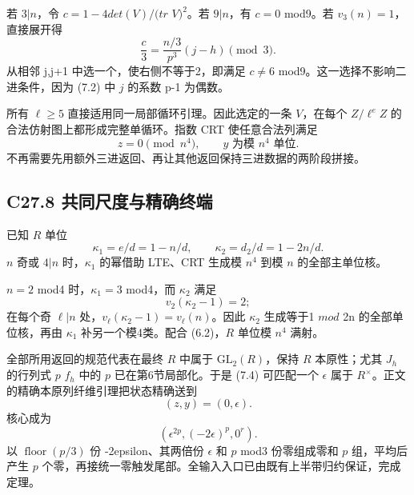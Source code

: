{若} {\ensuremath{3|n}，令} {\ensuremath{c=1-4det(V)/(tr}} {\ensuremath{V)^{2}}。若} {\ensuremath{9|n}，有} {\ensuremath{c=0}} {mod9。若} {\ensuremath{v_{3}(n)=1}，直接展开得} \[
\frac c3=\frac{n/3}{p^3}(j-h)\pmod3.
\tag{C27.7.3}
\] {从相邻} {j,j+1} {中选一个，使右侧不等于2，即满足} {\ensuremath{c\ne 6}} {mod9。这一选择不影响二进条件，因为} {(7.2)} {中} {\ensuremath{j}} {的系数} {p-1} {为偶数。}

{所有} {\ensuremath{\ell \ge 5}} {直接适用同一局部循环引理。因此选定的一条} {\ensuremath{V}，在每个} {\ensuremath{Z/\ell ^{e}Z}} {的合法仿射图上都形成完整单循环。指数} {CRT} {使任意合法列满足} \[
z=0\pmod{n^4},\qquad y\text{ 为模 }n^4\text{ 单位}.
\tag{C27.7.4}
\] {不再需要先用额外三进返回、再让其他返回保持三进数据的两阶段拼接。}

\subsection*{\texorpdfstring{{C27.8} {共同尺度与精确终端}}{C27.8 共同尺度与精确终端}}\label{C27-h175}

{已知} {\ensuremath{R}} {单位} \[
\kappa_1=e/d=1-n/d,\qquad
\kappa_2=d_2/d=1-2n/d.
\] {\ensuremath{n}} {奇或} {\ensuremath{4|n}} {时，\ensuremath{\kappa _{1}}} {的幂借助} {LTE、CRT} {生成模} {\ensuremath{n^{4}}} {到模} {\ensuremath{n}} {的全部主单位核。}

{\ensuremath{n=2}} {mod4} {时，\ensuremath{\kappa _{1}=3}} {mod4，而} {\ensuremath{\kappa _{2}}} {满足} \[
v_2(\kappa_2-1)=2;
\] {在每个奇} {\ensuremath{\ell |n}} {处，\ensuremath{v_\ell (\kappa _{2}-1)=v_\ell (n)}。因此} {\ensuremath{\kappa _{2}}} {生成等于1} {\ensuremath{mod}} {2n} {的全部单位核，再由} {\ensuremath{\kappa _{1}}} {补另一个模4类。配合} {(6.2)，\ensuremath{R}} {单位模} {\ensuremath{n^{4}}} {满射。}

{全部所用返回的规范代表在最终} {\ensuremath{R}} {中属于} {\ensuremath{\mathrm{GL}_{2}(R)}，保持} {\ensuremath{R}} {本原性；尤其} {\ensuremath{J_{h}}} {的行列式} {\ensuremath{p}} {\ensuremath{f_{h}}} {中的} {\ensuremath{p}} {已在第6节局部化。于是} {(7.4)} {可匹配一个} {\ensuremath{\epsilon }} {属于} {\ensuremath{R^\times}。正文的精确本原列纤维引理把状态精确送到} \[
(z,y)=(0,\epsilon).
\] {核心成为} \[
(\epsilon^{2p},(-2\epsilon)^p,0^r).
\] {以} {\ensuremath{\operatorname{floor}(p/3)}} {份} {-2epsilon、其两倍份} {\ensuremath{\epsilon }} {和} {\ensuremath{p}} {mod3} {份零组成零和} {\ensuremath{p}} {组，平均后产生} {\ensuremath{p}} {个零，再接统一零触发尾部。全输入入口已由既有上半带归约保证，完成定理。}


